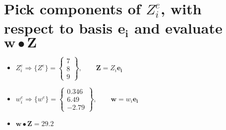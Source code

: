 \documentclass[10pt, letterpaper]{article}
\begin{document}
\section{ Pick components of $Z^e_i$, with respect to basis $\boldsymbol{e_i}$ and evaluate $\boldsymbol{w}
		\bullet  \boldsymbol{Z}$}
	\begin{itemize}
		\item $Z^e_i \Rightarrow \{Z^e \} = \begin{Bmatrix} 7 \\ 8 \\ 9 \end{Bmatrix}, \qquad
			\boldsymbol{Z} = Z_i \boldsymbol{e_i}$
		\item  $w^e_i \Rightarrow \{w^e \} = \begin{Bmatrix} 0.346 \\6.49 \\ -2.79 \end{Bmatrix}, \qquad
			\boldsymbol{w} = w_i \boldsymbol{e_i}$
		\item $ \boldsymbol{w} \bullet \boldsymbol{Z} = 29.2$
	\end{itemize}
 
\end{document}
